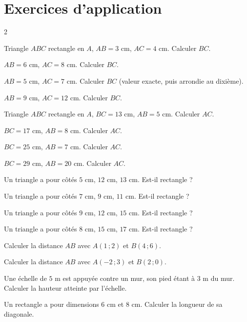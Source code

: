 \section{Exercices d'application}
\begin{multicols}{2}

\exo{} Triangle $ABC$ rectangle en $A$, $AB=3$ cm, $AC=4$ cm. Calculer $BC$.

\exo{} $AB=6$ cm, $AC=8$ cm. Calculer $BC$.

\exo{} $AB=5$ cm, $AC=7$ cm. Calculer $BC$ (valeur exacte, puis arrondie au
dixième).

\exo{} $AB=9$ cm, $AC=12$ cm. Calculer $BC$.

\exo{} Triangle $ABC$ rectangle en $A$, $BC=13$ cm, $AB=5$ cm. Calculer $AC$.

\exo{} $BC=17$ cm, $AB=8$ cm. Calculer $AC$.

\exo{} $BC=25$ cm, $AB=7$ cm. Calculer $AC$.

\exo{} $BC=29$ cm, $AB=20$ cm. Calculer $AC$.

\exo{} Un triangle a pour côtés $5$ cm, $12$ cm, $13$ cm. Est-il rectangle ?

\exo{} Un triangle a pour côtés $7$ cm, $9$ cm, $11$ cm. Est-il rectangle ?

\exo{} Un triangle a pour côtés $9$ cm, $12$ cm, $15$ cm. Est-il rectangle ?

\exo{} Un triangle a pour côtés $8$ cm, $15$ cm, $17$ cm. Est-il rectangle ?

\exo{} Calculer la distance $AB$ avec $A(1\,;2)$ et $B(4\,;6)$.

\exo{} Calculer la distance $AB$ avec $A(-2\,;3)$ et $B(2\,;0)$.

\exo{} Une échelle de $5$ m est appuyée contre un mur, son pied étant à $3$ m du
mur. Calculer la hauteur atteinte par l'échelle.

\exo{} Un rectangle a pour dimensions $6$ cm et $8$ cm. Calculer la longueur de sa
diagonale.

\end{multicols}

